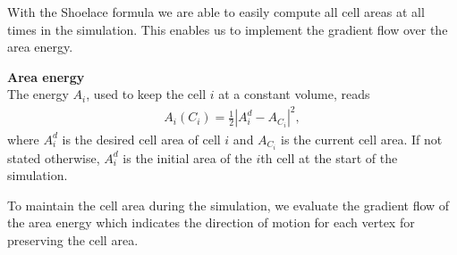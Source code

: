 With the Shoelace formula we are able to easily compute all cell areas at all times in the simulation. 
This enables us to implement the gradient flow over the area energy. 

\begin{definition} \textbf{Area energy} \\
	The energy $A_{i}$, used to keep the cell $i$ at a constant volume, reads 
	\begin{align}
		A_i(C_i) = \frac{1}{2} | A_i^d - A_{C_i}|^2, \label{eq:areaEnergy} 
	\end{align}
	where $A_i^d$ is the desired cell area of cell $i$ and $A_{C_i}$ is the current cell area. 
	If not stated otherwise, $A_i^d$ is the initial area of the $i$th cell at the start of the simulation. 
\end{definition}

To maintain the cell area during the simulation, we evaluate the gradient flow of the area energy which indicates the direction of motion for each vertex for preserving the cell area.

